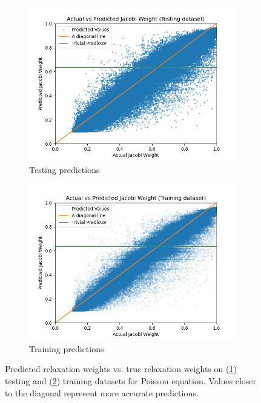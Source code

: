 \documentclass{siamart190516}
\begin{document}
\begin{figure}[h]
  \centering
  \begin{subfigure}{.48\textwidth}
    \includegraphics[width=\textwidth]{figs/poisson_jacobi_test_pred.png}
    \caption{Testing predictions}
    \label{subfig:poisson_jacobi_test}
  \end{subfigure}
  \begin{subfigure}{.48\textwidth}
    \includegraphics[width=\textwidth]{figs/poisson_jacobi_train_pred.png}
    \caption{Training predictions}
    \label{subfig:poisson_jacobi_train}
  \end{subfigure}
  \caption{ Predicted relaxation weights vs. true relaxation weights on (\ref{subfig:poisson_jacobi_test}) testing and (\ref{subfig:poisson_jacobi_train}) training datasets for Poisson equation. Values closer to the diagonal represent more accurate predictions. }
  \label{fig:poisson_jacobi_pred}
\end{figure}
\end{document}
